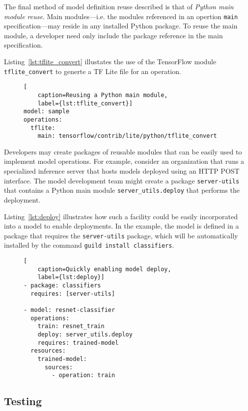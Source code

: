 \documentclass{article}
\begin{document}
The final method of model definition reuse described is that of
\emph{Python main module reuse}. Main modules---i.e. the modules
referenced in an opertion \verb|main| specification---may reside in
any installed Python package. To reuse the main module, a developer
need only include the package reference in the main specification.

Listing~\ref{lst:tflite_convert} illustates the use of the TensorFlow
module \verb|tflite_convert| to generte a TF Lite file for an
operation.

\begin{figure}
\begin{lstlisting}[
    caption=Reusing a Python main module,
    label={lst:tflite_convert}]
model: sample
operations:
  tflite:
    main: tensorflow/contrib/lite/python/tflite_convert
\end{lstlisting}
\end{figure}

Developers may create packages of reusable modules that can be easily
used to implement model operations. For example, consider an
organization that runs a specialized inference server that hosts
models deployed using an HTTP POST interface. The model development
team might create a package \verb|server-utils| that contains a Python
main module \verb|server_utils.deploy| that performs the
deployment.

Listing~\ref{lst:deploy} illustrates how such a facility could be
easily incorporated into a model to enable deployments. In the
example, the model is defined in a package that requires the
\verb|server-utils| package, which will be automatically installed by
the command \verb|guild install classifiers|.

\begin{figure}
\begin{lstlisting}[
    caption=Quickly enabling model deploy,
    label={lst:deploy}]
- package: classifiers
  requires: [server-utils]

- model: resnet-classifier
  operations:
    train: resnet_train
    deploy: server_utils.deploy
    requires: trained-model
  resources:
    trained-model:
      sources:
        - operation: train
\end{lstlisting}
\end{figure}

\subsection{Testing}
\end{document}
